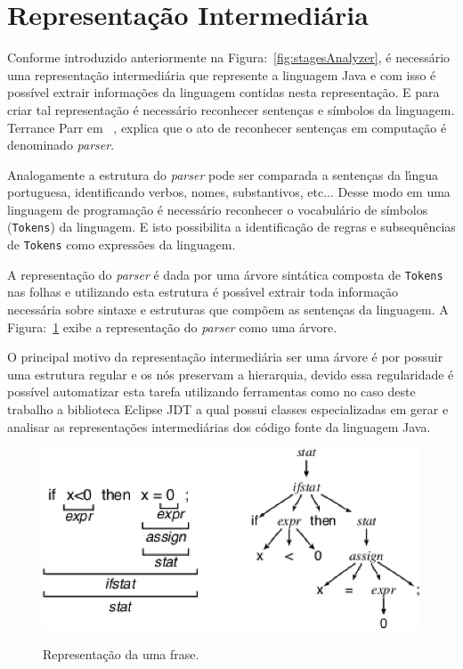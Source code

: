 \section{Representa\c{c}\~{a}o Intermedi\'{a}ria}\label{sec:IR}

Conforme introduzido anteriormente na Figura:~\ref{fig:stagesAnalyzer}, \'{e} necess\'{a}rio uma representa\c{c}\~{a}o intermedi\'{a}ria que represente a linguagem Java e com isso \'{e} poss\'{i}vel extrair informa\c{c}\~{o}es da linguagem contidas nesta representa\c{c}\~{a}o. E para criar tal representa\c{c}\~{a}o \'{e} necess\'{a}rio reconhecer senten\c{c}as e s\'{i}mbolos da linguagem. Terrance Parr em ~\cite{Parr:2009:LIP:1823613}, explica que o ato de reconhecer senten\c{c}as em computa\c{c}\~{a}o \'{e} denominado \textit{parser}.

Analogamente a estrutura do \textit{parser} pode ser comparada a senten\c{c}as da l\'{\i}ngua portuguesa, identificando verbos, nomes, substantivos, etc... Desse modo em uma linguagem de programa\c{c}\~{a}o \'{e} necess\'{a}rio reconhecer o vocabul\'{a}rio de s\'{i}mbolos (\texttt{Tokens}) da linguagem. E isto possibilita a identifica\c{c}\~{a}o de regras e subsequ\^{e}ncias de \texttt{Tokens} como express\~{o}es da linguagem.

A representa\c{c}\~{a}o do \textit{parser} \'{e} dada por uma árvore sint\'{a}tica composta de \texttt{Tokens} nas folhas e utilizando esta estrutura \'{e} poss\'{\i}vel extrair toda informa\c{c}\~{a}o necess\'{a}ria sobre sintaxe e estruturas que comp\~{o}em as senten\c{c}as da linguagem. A Figura:~\ref{fig:treeParse} exibe a representa\c{c}\~{a}o do \textit{parser} como uma \'{a}rvore.

O principal motivo da representa\c{c}\~{a}o intermedi\'{a}ria ser uma \'{a}rvore \'{e} por possuir uma estrutura regular e os n\'{o}s preservam a hierarquia, devido essa regularidade \'{e} poss\'{i}vel automatizar esta tarefa utilizando ferramentas como no caso deste trabalho a biblioteca Eclipse JDT a qual possui classes especializadas em gerar e analisar as representa\c{c}\~{o}es intermedi\'{a}rias dos c\'{o}digo fonte da linguagem Java.


\begin{figure}[h]
	\center
	\includegraphics[scale=0.9]{Imagens/treeParser}
	\label{fig:treeParse}
	\caption{Representa\c{c}\~{a}o da uma frase.}
\end{figure}


